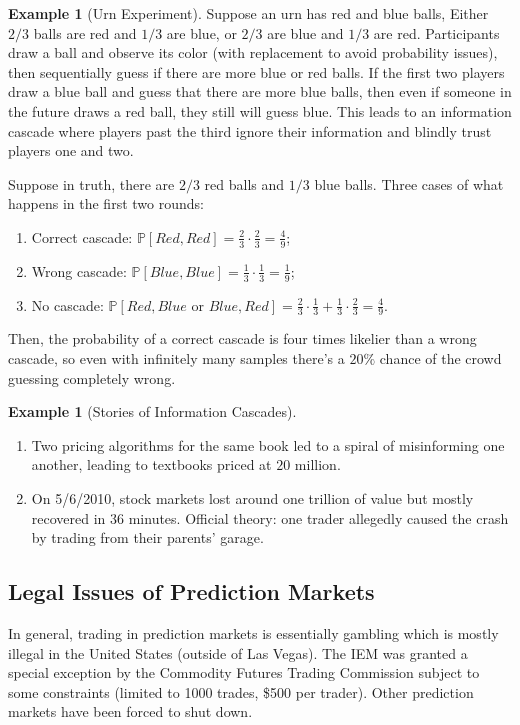 \documentclass[dvipsnames]{article}
\renewcommand{\P}[1]{\mathbb{P}\left[#1\right]}
\theoremstyle{definition}
\newtheorem{example}[definition]{Example}
\theoremstyle{remark}
\begin{document}
\begin{example}[Urn Experiment]
	Suppose an urn has red and blue balls, Either $2/3$ balls are red and $1/3$ are blue, or $2/3$ are blue and $1/3$ are red. Participants draw a ball and observe its color (with replacement to avoid probability issues), then sequentially guess if there are more blue or red balls. If the first two players draw a blue ball and guess that there are more blue balls, then even if someone in the future draws a red ball, they still will guess blue. This leads to an information cascade where players past the third ignore their information and blindly trust players one and two.
	
	Suppose in truth, there are $2/3$ red balls and $1/3$ blue balls. Three cases of what happens in the first two rounds:
	\begin{enumerate}
		\item Correct cascade: $\P{Red, Red} = \frac{2}{3} \cdot \frac{2}{3} = \frac{4}{9}$;
		\item Wrong cascade: $\P{Blue, Blue} = \frac{1}{3} \cdot \frac{1}{3} = \frac{1}{9}$;
		\item No cascade: $\P{Red, Blue \text{ or } Blue, Red} = \frac{2}{3} \cdot \frac{1}{3} +\frac{1}{3} \cdot \frac{2}{3} = \frac{4}{9}$.
	\end{enumerate}
	Then, the probability of a correct cascade is four times likelier than a wrong cascade, so even with infinitely many samples there's a $20\%$ chance of the crowd guessing completely wrong.
\end{example}

\begin{example}[Stories of Information Cascades]
	\begin{enumerate}
		\item Two pricing algorithms for the same book led to a spiral of misinforming one another, leading to textbooks priced at $20$ million.
		\item On 5/6/2010, stock markets lost around one trillion of value but mostly recovered in 36 minutes. Official theory: one trader allegedly caused the crash by trading from their parents' garage.
	\end{enumerate}
\end{example}

\subsection{Legal Issues of Prediction Markets}
In general, trading in prediction markets is essentially gambling which is mostly illegal in the United States (outside of Las Vegas). The IEM was granted a special exception by the Commodity Futures Trading Commission subject to some constraints (limited to 1000 trades, \$500 per trader). Other prediction markets have been forced to shut down.
\end{document}
